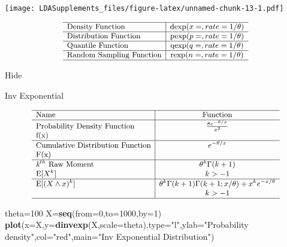 \documentclass[]{book}
\newenvironment{Shaded}{\begin{snugshade}}{\end{snugshade}}
\newcommand{\KeywordTok}[1]{\textcolor[rgb]{0.13,0.29,0.53}{\textbf{#1}}}
\newcommand{\DataTypeTok}[1]{\textcolor[rgb]{0.13,0.29,0.53}{#1}}
\newcommand{\DecValTok}[1]{\textcolor[rgb]{0.00,0.00,0.81}{#1}}
\newcommand{\StringTok}[1]{\textcolor[rgb]{0.31,0.60,0.02}{#1}}
\newcommand{\NormalTok}[1]{#1}
\begin{document}
\texttt{[image: LDASupplements\_files/figure-latex/unnamed-chunk-13-1.pdf]}

\[
{\small
\begin{matrix}
\begin{array}{l|c}
\hline
  \text{Density Function} & \text{dexp}(x=, rate=1/\theta) \\
\hline
  \text{Distribution Function} & \text{pexp}(p=, rate=1/\theta) \\
\hline
  \text{Quantile Function} & \text{qexp}(q=, rate=1/\theta) \\ 
\hline
  \text{Random Sampling Function} & \text{rexp}(n=, rate=1/\theta) \\
\hline
\end{array}
\end{matrix}
}
\]

\hypertarget{1pB}{}
{Hide}

Inv Exponential

\[
{\small
\begin{matrix}
\begin{array}{l|c}
\hline
  \text{Name} & \text{Function} \\
\hline
  \text{Probability Density Function} & \frac{\theta e^{-\theta/x}}{x^2} \\
    \text{f(x)} & \\
\hline
  \text{Cumulative Distribution Function} & e^{-\theta/x} \\
    \text{F(x)} & \\
\hline
  \textit{k}^{th}~\text{Raw Moment} & \theta^k\Gamma(k+1) \\
  \mathrm{E}[X^k]  & k>-1 \\
\hline
  \mathrm{E}[(X\wedge x)^k] & \theta^k\Gamma(k+1)\Gamma(k+1;x/\theta)+x^k e^{-x/\theta} \\
  & k>-1 \\
\hline
\end{array}
\end{matrix}
}
\]

\begin{Shaded}
\begin{Highlighting}[]
\NormalTok{theta=}\DecValTok{100}
\NormalTok{X=}\KeywordTok{seq}\NormalTok{(}\DataTypeTok{from=}\DecValTok{0}\NormalTok{,}\DataTypeTok{to=}\DecValTok{1000}\NormalTok{,}\DataTypeTok{by=}\DecValTok{1}\NormalTok{)}
\KeywordTok{plot}\NormalTok{(}\DataTypeTok{x=}\NormalTok{X,}\DataTypeTok{y=}\KeywordTok{dinvexp}\NormalTok{(X,}\DataTypeTok{scale=}\NormalTok{theta),}\DataTypeTok{type=}\StringTok{"l"}\NormalTok{,}\DataTypeTok{ylab=}\StringTok{"Probability density"}\NormalTok{,}\DataTypeTok{col=}\StringTok{"red"}\NormalTok{,}\DataTypeTok{main=}\StringTok{"Inv Exponential Distribution"}\NormalTok{)}
\end{Highlighting}
\end{Shaded}
\end{document}
